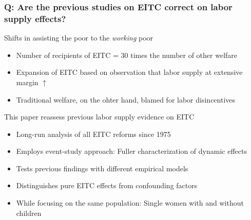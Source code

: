 \documentclass[aspectratio=169]{beamer}
\begin{document}
\begin{frame}
\frametitle{Q: Are the previous studies on EITC correct on labor supply effects?}
Shifts in assisting the poor to the \textit{working} poor
\begin{itemize}\setlength\itemsep{3pt}
\item Number of recipients of EITC = 30 times the number of other welfare
\item Expansion of EITC based on observation that labor supply at extensive margin $\uparrow$
\item Traditional welfare, on the ohter hand, blamed for labor disincentives
\end{itemize}\medskip
This paper reassess previous labor supply evidence on EITC
\begin{itemize}\setlength\itemsep{3pt}
\item Long-run analysis of all EITC reforms since 1975
\item Employs event-study approach: Fuller characterization of dynamic effects
\item Tests previous findings with different empirical models
\item Distinguishes pure EITC effects from confounding factors 
\item While focusing on the same population: Single women with and without children
\end{itemize}
\end{frame}
\end{document}
